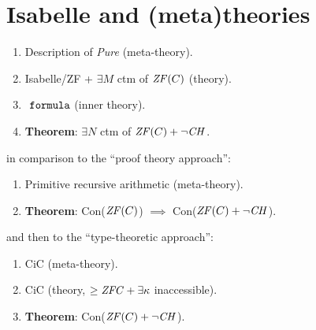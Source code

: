 \section{Isabelle and (meta)theories}

\begin{enumerate}
\item Description of \emph{Pure} (meta-theory).
\item Isabelle/ZF + $\exists M$ ctm of $\mathit{ZF}(C)$ (theory). 
\item $\formula$ (inner theory).
\item \textbf{Theorem}: $\exists N$ ctm of $\mathit{ZF}(C)+\neg\mathit{CH}$.
\end{enumerate}

in comparison to the ``proof theory approach'':

\begin{enumerate}
\item Primitive recursive arithmetic (meta-theory).
\item \textbf{Theorem}: Con($\mathit{ZF}(C)$) $\implies$ Con($\mathit{ZF}(C)+\neg\mathit{CH}$).
\end{enumerate}

and then to the ``type-theoretic approach'':

\begin{enumerate}
\item CiC (meta-theory).
\item CiC (theory, $\geq \mathit{ZFC} + \exists \kappa$ inaccessible).
\item \textbf{Theorem}: Con($\mathit{ZF}(C)+\neg\mathit{CH}$).
\end{enumerate}

